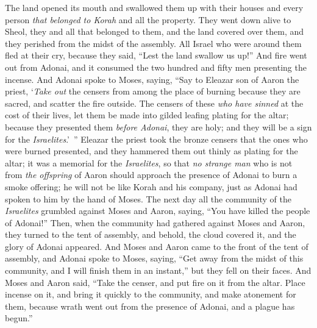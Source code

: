 \begin{biblechapter}
\verse The land opened its mouth and swallowed them up with their houses and every person \textit{that belonged to Korah} and all the property.
\verse They went down alive to Sheol, they and all that belonged to them, and the land covered over them, and they perished from the midst of the assembly.
\verse All Israel who were around them fled at their cry, because they said, “Lest the land swallow us up!”
\verse And fire went out from Adonai, and it consumed the two hundred and fifty men presenting the incense.
\verse {} And Adonai spoke to Moses, saying,
\verse “Say to Eleazar son of Aaron the priest, ‘\textit{Take out} the censers from among the place of burning because they are sacred, and scatter the fire outside.
\verse The censers of these \textit{who have sinned} at the cost of their lives, let them be made into gilded leafing plating for the altar; because they presented them \textit{before Adonai}, they are holy; and they will be a sign for the \textit{Israelites}.’ ”
\verse Eleazar the priest took the bronze censers that the ones who were burned presented, and they hammered them out thinly as plating for the altar;
\verse it was a memorial for the \textit{Israelites}, so that \textit{no strange man} who is not from \textit{the offspring} of Aaron should approach the presence of Adonai to burn a smoke offering; he will not be like Korah and his company, just as Adonai had spoken to him by the hand of Moses.
 The next day all the community of the \textit{Israelites} grumbled against Moses and Aaron, saying, “You have killed the people of Adonai!”
\verse Then, when the community had gathered against Moses and Aaron, they turned to the tent of assembly, and behold, the cloud covered it, and the glory of Adonai appeared.
\verse And Moses and Aaron came to the front of the tent of assembly,
\verse and Adonai spoke to Moses, saying,
\verse “Get away from the midst of this community, and I will finish them in an instant,” but they fell on their faces.
\verse And Moses and Aaron said, “Take the censer, and put fire on it from the altar. Place incense on it, and bring it quickly to the community, and make atonement for them, because wrath went out from the presence of Adonai, and a plague has begun.”

\end{biblechapter}
